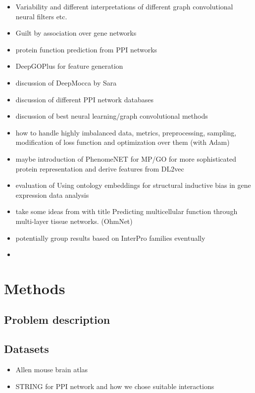 \documentclass[]{article}
\renewcommand{\cite}{\citep}
\begin{document}
\begin{itemize}
	\item Variability and different interpretations of different graph convolutional neural filters \cite{GCNConv, GENConv2020, SAGEConv} etc.
	\item Guilt by association over gene networks \cite{Oliver2000, Gillis2012}
	\item protein function prediction from PPI networks \cite{Vazquez2003}
	\item DeepGOPlus for feature generation \cite{DeepGoPlus}
	\item discussion of DeepMocca by Sara \cite{DeepMocca2021}
	\item discussion of different PPI network databases \cite{STRINGv10}
	\item discussion of best neural learning/graph convolutional methods \cite{Pytorch, PytorchGeometric}
	\item how to handle highly imbalanced data, metrics, preprocessing, sampling, modification of loss function \cite{Jeni2013} and optimization over them (with Adam\cite{Adam2014})
	\item maybe introduction of PhenomeNET for MP/GO for more sophisticated protein representation \cite{PhenomeNET2011, GOoriginal2000, GOrecent2020, MP2009} and derive features from DL2vec \cite{DL2vec2020, Word2vec2013}
	\item evaluation of \glqq Using ontology embeddings for structural inductive bias in gene expression data analysis\grqq{}\cite{Trebacz2020}
	\item take some ideas from \citet{Zitnik2017} with title \glqq Predicting multicellular function through multi-layer tissue networks\grqq{}. (OhmNet)
	\item potentially group results based on InterPro\cite{Interpro2020} families eventually
	\item 
	
	
\end{itemize}

\section{Methods}
\subsection{Problem description}

\subsection{Datasets}
\begin{itemize}
	\item Allen mouse brain atlas \cite{MouseBrainAtlas}
	\item STRING for PPI network and how we chose suitable interactions \cite{STRINGv10}
\end{itemize}
\end{document}

